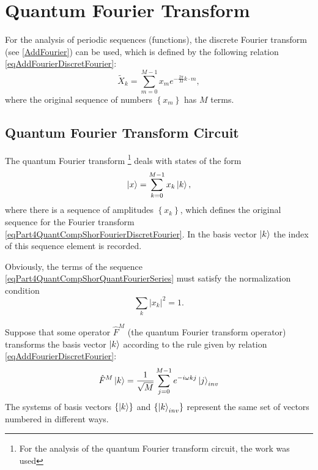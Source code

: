 \section{Quantum Fourier Transform}
For the analysis of periodic sequences (functions), the discrete Fourier transform
(see \autoref{AddFourier}) can be used,
which is defined by the following relation
\eqref{eqAddFourierDiscretFourier}:
\begin{equation}
\tilde{X}_k = \sum^{M - 1}_{m = 0} x_m e^{-\frac{2 \pi}{M} k\cdot m},
\label{eqPart4QuantCompShorFourierDiscretFourier}
\end{equation}
where the original sequence of numbers $\left\{x_m\right\}$ has $M$
terms. 

\subsection{Quantum Fourier Transform Circuit}
The quantum Fourier transform
\footnote{For the analysis of the quantum Fourier transform circuit,
  the work \cite{DBLP:conf/new2an/2015} was used}
deals with states of the form 
\begin{equation}
\ket{x} = \sum_{k = 0}^{M - 1}x_k \ket{k},
\label{eqPart4QuantCompShorQuantFourierSeries}
\end{equation}
where there is a sequence of amplitudes $\left\{x_k\right\}$, which
defines the original sequence for the Fourier transform 
\eqref{eqPart4QuantCompShorFourierDiscretFourier}. In the basis vector
$\ket{k}$ the index of this sequence element is recorded.   

Obviously, the terms of the sequence
\eqref{eqPart4QuantCompShorQuantFourierSeries} must satisfy
the normalization condition 
\[
\sum_k\left|x_k\right|^2 = 1.
\]

Suppose that some operator $\hat{F}^{M}$ (the quantum
Fourier transform operator) transforms the basis vector $\ket{k}$ according to
the rule given by relation \eqref{eqAddFourierDiscretFourier}:
\begin{equation}
\hat{F}^{M}\ket{k} = \frac{1}{\sqrt{M}}\sum_{j = 0}^{M -1}
e^{-i \omega k j}\ket{j}_{inv} 
\label{eqPart4QuantCompShorQuantFourierBasis}
\end{equation}
The systems of basis vectors $\left\{\ket{k}\right\}$ and 
$\left\{\ket{k}_{inv}\right\}$ represent the same
set of vectors numbered in different ways.

